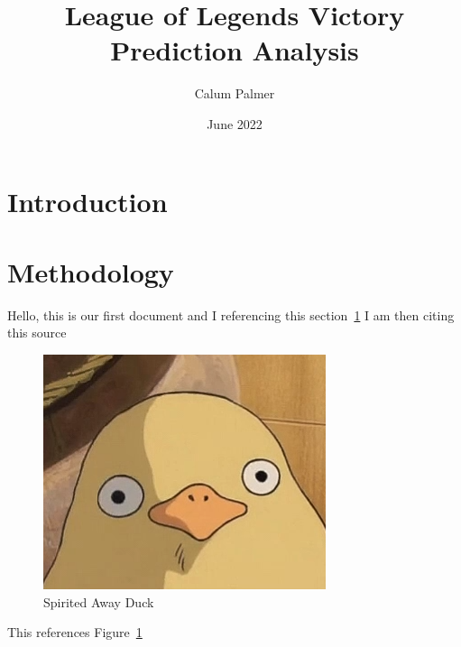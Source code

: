\documentclass[11pt, A4]{article}
\title{League of Legends Victory Prediction Analysis}
\author{Calum Palmer}
\date{June 2022}
\begin{document}
    \begin{titlepage}
    \maketitle
    \end{titlepage}

    \section{Introduction}\label{sec:introduction}

    \section{Methodology}\label{sec:methodology}

    Hello, this is our first document and I referencing this section~\ref{sec:introduction}
    I am then citing this source~\cite{ani2019victory}

    \begin{figure}
        \centering
        \includegraphics{figures/SpiritedAwayDuck3}
        \caption{Spirited Away Duck}
        \label{fig:SpiritedAwayDuck}
    \end{figure}


    This references Figure~\ref{fig:SpiritedAwayDuck}

    
    
\end{document}
